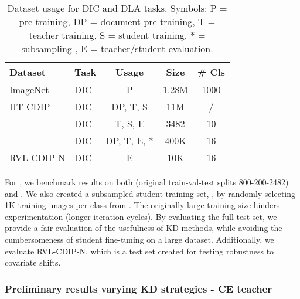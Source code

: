 \begin{table}[ht]
\centering
\caption{Dataset usage for DIC and DLA tasks. 
Symbols: P = pre-training, DP = document pre-training, T = teacher training, S = student training, * = subsampling , E = teacher/student evaluation.}
\begin{tabular}{|l|l|c|c|c|}
\hline
\textbf{Dataset} & \textbf{Task} & \textbf{Usage} & \textbf{Size} & \textbf{\# Cls} \\ \hline
ImageNet \cite{deng2009imagenet} & DIC & P & 1.28M & 1000 \\ \hline
IIT-CDIP \cite{lewis2006building} & DIC & DP, T, S & 11M & / \\ \hline
\tobacco{} \cite{kumar2013unsupervised} & DIC & T, S, E & 3482 & 10 \\ \hline
\rvl{} \cite{harley2015evaluation} & DIC & DP, T, E, * & 400K & 16 \\ \hline
RVL-CDIP-N \cite{larson2022evaluating} & DIC & E & 10K & 16 \\ \hline
\hline
\end{tabular}
\label{tab:DKD-datasets}
\end{table}

For \DC{}, we benchmark results on both \tobacco{} (original train-val-test splits 800-200-2482) and \rvl.  
We also created a subsampled student training set, \rvlone, by randomly selecting 1K training images per class from \rvl. The originally large training size hinders experimentation (longer iteration cycles).
By evaluating the full \rvl{} test set, we provide a fair evaluation of the usefulness of KD methods, while avoiding the cumbersomeness of student fine-tuning on a large dataset. Additionally, we evaluate RVL-CDIP-N, which is a test set created for testing robustness to covariate shifts.




\subsubsection{Preliminary results varying KD strategies - CE teacher}

